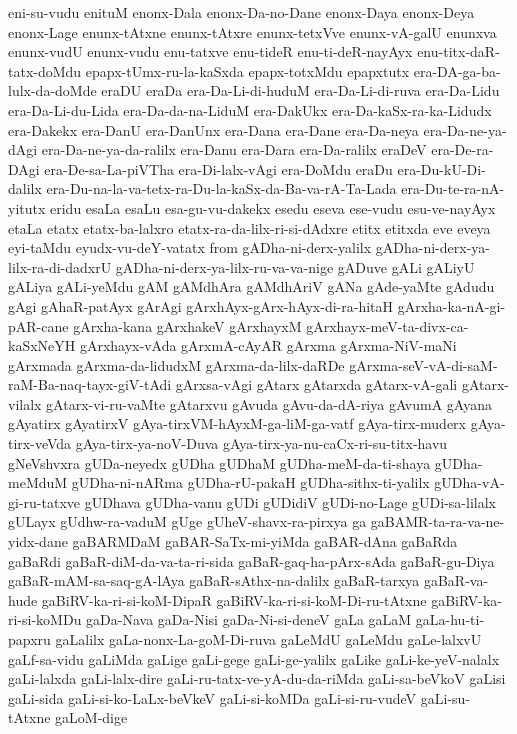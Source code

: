 {eni-su-vudu
enituM
enonx-Dala
enonx-Da-no-Dane
enonx-Daya
enonx-Deya
enonx-Lage
enunx-tAtxne
enunx-tAtxre
enunx-tetxVve
enunx-vA-galU
enunxva
enunx-vudU
enunx-vudu
enu-tatxve
enu-tideR
enu-ti-deR-nayAyx
enu-titx-daR-tatx-doMdu
epapx-tUmx-ru-la-kaSxda
epapx-totxMdu
epapxtutx
era-DA-ga-ba-lulx-da-doMde
eraDU
eraDa
era-Da-Li-di-huduM
era-Da-Li-di-ruva
era-Da-Lidu
era-Da-Li-du-Lida
era-Da-da-na-LiduM
era-DakUkx
era-Da-kaSx-ra-ka-Lidudx
era-Dakekx
era-DanU
era-DanUnx
era-Dana
era-Dane
era-Da-neya
era-Da-ne-ya-dAgi
era-Da-ne-ya-da-ralilx
era-Danu
era-Dara
era-Da-ralilx
eraDeV
era-De-ra-DAgi
era-De-sa-La-piVTha
era-Di-lalx-vAgi
era-DoMdu
eraDu
era-Du-kU-Di-dalilx
era-Du-na-la-va-tetx-ra-Du-la-kaSx-da-Ba-va-rA-Ta-Lada
era-Du-te-ra-nA-yitutx
eridu
esaLa
esaLu
esa-gu-vu-dakekx
esedu
eseva
ese-vudu
esu-ve-nayAyx
etaLa
etatx
etatx-ba-lalxro
etatx-ra-da-lilx-ri-si-dAdxre
etitx
etitxda
eve
eveya
eyi-taMdu
eyudx-vu-deY-vatatx
from
gADha-ni-derx-yalilx
gADha-ni-derx-ya-lilx-ra-di-dadxrU
gADha-ni-derx-ya-lilx-ru-va-va-nige
gADuve
gALi
gALiyU
gALiya
gALi-yeMdu
gAM
gAMdhAra
gAMdhAriV
gANa
gAde-yaMte
gAdudu
gAgi
gAhaR-patAyx
gArAgi
gArxhAyx-gArx-hAyx-di-ra-hitaH
gArxha-ka-nA-gi-pAR-cane
gArxha-kana
gArxhakeV
gArxhayxM
gArxhayx-meV-ta-divx-ca-kaSxNeYH
gArxhayx-vAda
gArxmA-cAyAR
gArxma
gArxma-NiV-maNi
gArxmada
gArxma-da-lidudxM
gArxma-da-lilx-daRDe
gArxma-seV-vA-di-saM-raM-Ba-naq-tayx-giV-tAdi
gArxsa-vAgi
gAtarx
gAtarxda
gAtarx-vA-gali
gAtarx-vilalx
gAtarx-vi-ru-vaMte
gAtarxvu
gAvuda
gAvu-da-dA-riya
gAvumA
gAyana
gAyatirx
gAyatirxV
gAya-tirxVM-hAyxM-ga-liM-ga-vatf
gAya-tirx-muderx
gAya-tirx-veVda
gAya-tirx-ya-noV-Duva
gAya-tirx-ya-nu-caCx-ri-su-titx-havu
gNeVshvxra
gUDa-neyedx
gUDha
gUDhaM
gUDha-meM-da-ti-shaya
gUDha-meMduM
gUDha-ni-nARma
gUDha-rU-pakaH
gUDha-sithx-ti-yalilx
gUDha-vA-gi-ru-tatxve
gUDhava
gUDha-vanu
gUDi
gUDidiV
gUDi-no-Lage
gUDi-sa-lilalx
gULayx
gUdhw-ra-vaduM
gUge
gUheV-shavx-ra-pirxya
ga
gaBAMR-ta-ra-va-ne-yidx-dane
gaBARMDaM
gaBAR-SaTx-mi-yiMda
gaBAR-dAna
gaBaRda
gaBaRdi
gaBaR-diM-da-va-ta-ri-sida
gaBaR-gaq-ha-pArx-sAda
gaBaR-gu-Diya
gaBaR-mAM-sa-saq-gA-lAya
gaBaR-sAthx-na-dalilx
gaBaR-tarxya
gaBaR-va-hude
gaBiRV-ka-ri-si-koM-DipaR
gaBiRV-ka-ri-si-koM-Di-ru-tAtxne
gaBiRV-ka-ri-si-koMDu
gaDa-Nava
gaDa-Nisi
gaDa-Ni-si-deneV
gaLa
gaLaM
gaLa-hu-ti-papxru
gaLalilx
gaLa-nonx-La-goM-Di-ruva
gaLeMdU
gaLeMdu
gaLe-lalxvU
gaLf-sa-vidu
gaLiMda
gaLige
gaLi-gege
gaLi-ge-yalilx
gaLike
gaLi-ke-yeV-nalalx
gaLi-lalxda
gaLi-lalx-dire
gaLi-ru-tatx-ve-yA-du-da-riMda
gaLi-sa-beVkoV
gaLisi
gaLi-sida
gaLi-si-ko-LaLx-beVkeV
gaLi-si-koMDa
gaLi-si-ru-vudeV
gaLi-su-tAtxne
gaLoM-dige
}
